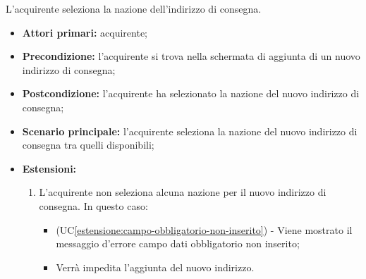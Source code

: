 \label{inserimento-indirizzo-consegna.modulo.nazione}

L'acquirente seleziona la nazione dell'indirizzo di consegna.
\begin{itemize}
    \item \textbf{Attori primari:} acquirente;
    \item \textbf{Precondizione:} l'acquirente si trova nella schermata di aggiunta di un nuovo indirizzo di consegna;
    \item \textbf{Postcondizione:} l'acquirente ha selezionato la nazione del nuovo indirizzo di consegna;
    \item \textbf{Scenario principale:} l'acquirente seleziona la nazione del nuovo indirizzo di consegna tra quelli disponibili;
    \item \textbf{Estensioni:}
    \begin{enumerate}[label=\lett]
        \item L'acquirente non seleziona alcuna nazione per il nuovo indirizzo di consegna. In questo caso:
        \begin{itemize}
            \item (UC\ref{estensione:campo-obbligatorio-non-inserito}) - Viene mostrato il messaggio d'errore campo dati obbligatorio non inserito;
            \item Verrà impedita l'aggiunta del nuovo indirizzo.
        \end{itemize}
    \end{enumerate}
\end{itemize}

\label{inserimento-indirizzo-consegna.modulo.comune}

